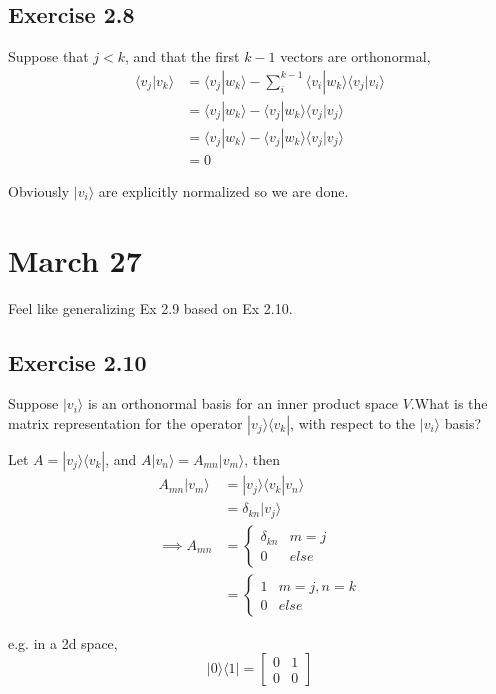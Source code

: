 \documentclass[]{article}
\newcommand{\bra}[1]{\langle #1 |}
\newcommand{\ket}[1]{| #1 \rangle}
\newcommand{\braket}[2]{\langle #1 | #2 \rangle}
\begin{document}
\subsection{Exercise 2.8}

Suppose that $j < k$, and that the first $k-1$ vectors are orthonormal,
\begin{align*}
	\braket{v_j}{v_k}
	&= \braket{v_j}{w_k} - \sum_i^{k-1}\braket{v_i}{w_k}\braket{v_j}{v_i} \\
	&= \braket{v_j}{w_k} - \braket{v_j}{w_k} \braket{v_j}{v_j} \\
	&= \braket{v_j}{w_k} - \braket{v_j }{ w_k} \braket{v_j}{v_j} \\
&= 0
\end{align*}

Obviously $\ket{v_i}$ are explicitly normalized so we are done.

\section{March 27}

Feel like generalizing Ex 2.9 based on Ex 2.10.

\subsection{Exercise 2.10}

Suppose $\ket{v_i}$ is an orthonormal basis for an inner product space
$V$.What is the matrix representation for the operator
$\ket{v_j}\bra{v_k}$, with respect to the $\ket{v_i}$ basis?

Let $A = \ket{v_j}\bra{v_k}$, and $A\ket{v_n} = A_{mn}\ket{v_m}$, then
\begin{align*}
	A_{mn}\ket{v_m}
	&= \ket{v_j} \braket{v_k}{v_n} \\
	&= \delta_{kn}\ket{v_j} \\
\implies A_{mn}
&= \begin{cases}
\delta_{kn} & m = j \\
0 & else
\end{cases} \\
&= \begin{cases}
1 & m = j, n = k \\
0 & else
\end{cases}
\end{align*}

e.g. in a 2d space,
\[\ket{0}\bra{1} = \left[\begin{matrix}
0 & 1 \\
0 & 0
\end{matrix}\right]\]
\end{document}
